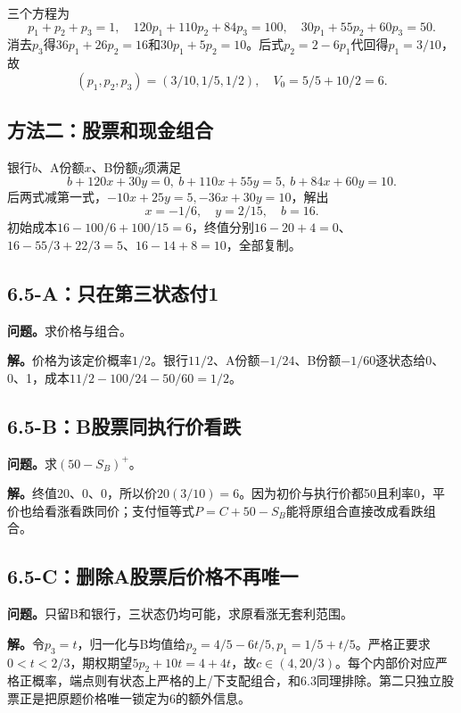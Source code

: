 \documentclass[11pt,a4paper,UTF8,fontset=fandol]{ctexart}
\begin{document}
三个方程为
\[p_1+p_2+p_3=1,\quad120p_1+110p_2+84p_3=100,\quad30p_1+55p_2+60p_3=50.\]
消去\(p_3\)得\(36p_1+26p_2=16\)和\(30p_1+5p_2=10\)。后式\(p_2=2-6p_1\)代回得\(p_1=3/10\)，故
\[\boxed{(p_1,p_2,p_3)=(3/10,1/5,1/2),\quad V_0=5/5+10/2=6.}\]

\subsection{方法二：股票和现金组合}\label{ux65b9ux6cd5ux4e8cux80a1ux7968ux548cux73b0ux91d1ux7ec4ux5408}

银行\(b\)、A份额\(x\)、B份额\(y\)须满足
\[b+120x+30y=0,\ b+110x+55y=5,\ b+84x+60y=10.\]
后两式减第一式，\(-10x+25y=5,-36x+30y=10\)，解出
\[\boxed{x=-1/6,\quad y=2/15,\quad b=16.}\]
初始成本\(16-100/6+100/15=6\)，终值分别\(16-20+4=0\)、\(16-55/3+22/3=5\)、\(16-14+8=10\)，全部复制。

\subsection{6.5-A：只在第三状态付1}\label{aux53eaux5728ux7b2cux4e09ux72b6ux6001ux4ed81}

\textbf{问题。}求价格与组合。

\textbf{解。}价格为该定价概率\(\boxed{1/2}\)。银行\(11/2\)、A份额\(-1/24\)、B份额\(-1/60\)逐状态给0、0、1，成本\(11/2-100/24-50/60=1/2\)。

\subsection{6.5-B：B股票同执行价看跌}\label{bbux80a1ux7968ux540cux6267ux884cux4ef7ux770bux8dcc}

\textbf{问题。}求\((50-S_B)^+\)。

\textbf{解。}终值20、0、0，所以价\(20(3/10)=\boxed6\)。因为初价与执行价都50且利率0，平价也给看涨看跌同价；支付恒等式\(P=C+50-S_B\)能将原组合直接改成看跌组合。

\subsection{6.5-C：删除A股票后价格不再唯一}\label{cux5220ux9664aux80a1ux7968ux540eux4ef7ux683cux4e0dux518dux552fux4e00}

\textbf{问题。}只留B和银行，三状态仍均可能，求原看涨无套利范围。

\textbf{解。}令\(p_3=t\)，归一化与B均值给\(p_2=4/5-6t/5,p_1=1/5+t/5\)。严格正要求\(0<t<2/3\)，期权期望\(5p_2+10t=4+4t\)，故\(\boxed{c\in(4,20/3)}\)。每个内部价对应严格正概率，端点则有状态上严格的上/下支配组合，和6.3同理排除。第二只独立股票正是把原题价格唯一锁定为6的额外信息。
\end{document}
